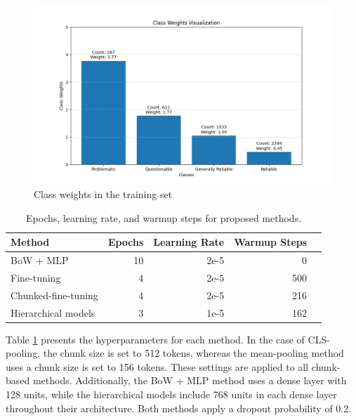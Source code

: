 \begin{figure}[htbp]
    \centering
    \includegraphics[width=0.8\linewidth]{figures/class_weights.png}
    \caption{Class weights in the training set}
    \label{fig:class_weights}
\end{figure}


\begin{table}[htbp]
    \centering
    \small
    \begin{tabular}{| l | r | r | r | r |}
        \hline                            \textbf{Method} & \textbf{Epochs} & \textbf{Learning Rate} & \textbf{Warmup Steps} \\
        \hline
        BoW + MLP                                         & 10              & 2e-5                   & 0                     \\
        \hline
        Fine-tuning                                       & 4               & 2e-5                   & 500                   \\
        \hline
        Chunked-fine-tuning                               & 4               & 2e-5                   & 216                   \\
        \hline
        Hierarchical models                               & 3               & 1e-5                   & 162                   \\
        \hline
    \end{tabular}
    \caption{Epochs, learning rate, and warmup steps for proposed methods.}
    \label{table:hyperparameters}
\end{table}

Table \ref{table:hyperparameters} presents the hyperparameters for each method. In the case of CLS-pooling, the chunk size is set to 512 tokens, whereas the mean-pooling method uses a chunk size is set to 156 tokens. These settings are applied to all chunk-based methods. Additionally, the BoW + MLP method uses a dense layer with 128 units, while the hierarchical models include 768 units in each dense layer throughout their architecture. Both methods apply a dropout probability of 0.2.

